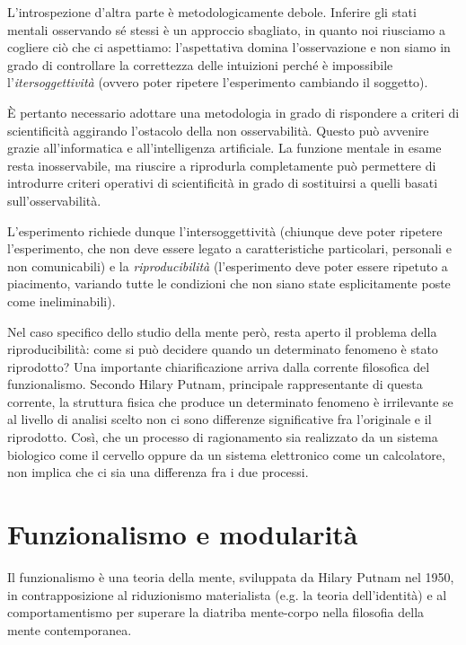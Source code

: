 L’introspezione d’altra parte è metodologicamente debole. Inferire gli stati mentali osservando sé stessi è un approccio sbagliato, in quanto noi riusciamo a cogliere ciò che ci aspettiamo: l’aspettativa domina l’osservazione e non siamo in grado di controllare la correttezza delle intuizioni perché è impossibile l’\emph{itersoggettività} (ovvero poter ripetere l’esperimento cambiando il soggetto).

È pertanto necessario adottare una metodologia in grado di rispondere a criteri di scientificità aggirando l’ostacolo della non osservabilità. Questo può avvenire grazie all’informatica e all’intelligenza artificiale. La funzione mentale in esame resta inosservabile, ma riuscire a riprodurla completamente può permettere di introdurre criteri operativi di scientificità in grado di sostituirsi a quelli basati sull’osservabilità.

L’esperimento richiede dunque l’intersoggettività (chiunque deve poter ripetere l’esperimento, che non deve essere legato a caratteristiche particolari, personali e non comunicabili) e la \emph{riproducibilità} (l’esperimento deve poter essere ripetuto a piacimento, variando tutte le condizioni che non siano state esplicitamente poste come ineliminabili).

Nel caso specifico dello studio della mente però, resta aperto il problema della riproducibilità: come si può decidere quando un determinato fenomeno è stato riprodotto? Una importante chiarificazione arriva dalla corrente filosofica del funzionalismo. Secondo Hilary Putnam, principale rappresentante di questa corrente, la struttura fisica che produce un determinato fenomeno è irrilevante se al livello di analisi scelto non ci sono differenze significative fra l’originale e il riprodotto. Così, che un processo di ragionamento sia realizzato da un sistema biologico come il cervello oppure da un sistema elettronico come un calcolatore, non implica che ci sia una differenza fra i due processi.

\section{Funzionalismo e modularità}
Il funzionalismo è una teoria della mente, sviluppata da Hilary Putnam nel 1950, in contrapposizione al riduzionismo materialista (e.g. la teoria dell'identità) e al comportamentismo per superare la diatriba mente-corpo nella filosofia della mente contemporanea.

